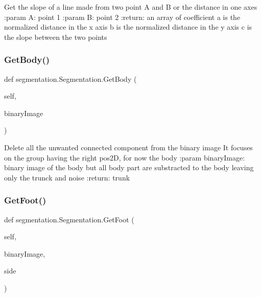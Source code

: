 \begin{DoxyVerb}Get the slope of a line made from two point A and B or the distance in one axes
:param A: point 1
:param B: point 2
:return: an array of coefficient
a is the normalized distance in the x axis
b is the normalized distance in the y axis
c is the slope between the two points
\end{DoxyVerb}
 \mbox{\label{classsegmentation_1_1_segmentation_a974ac6a7e245713d6f5f2b7531fe6d71}} 
\subsubsection{\texorpdfstring{Get\+Body()}{GetBody()}}
{\footnotesize\ttfamily def segmentation.\+Segmentation.\+Get\+Body (\begin{DoxyParamCaption}\item[{}]{self,  }\item[{}]{binary\+Image }\end{DoxyParamCaption})}

\begin{DoxyVerb}Delete all the unwanted connected component from the binary image
It focuses on the group having the right pos2D, for now the body
:param binaryImage: binary image of the body but all body part are substracted to the body leaving only the trunck and noise
:return: trunk
\end{DoxyVerb}
 \mbox{\label{classsegmentation_1_1_segmentation_ad4a3e196437e4577129dc7c5aed2f559}} 
\subsubsection{\texorpdfstring{Get\+Foot()}{GetFoot()}}
{\footnotesize\ttfamily def segmentation.\+Segmentation.\+Get\+Foot (\begin{DoxyParamCaption}\item[{}]{self,  }\item[{}]{binary\+Image,  }\item[{}]{side }\end{DoxyParamCaption})}

